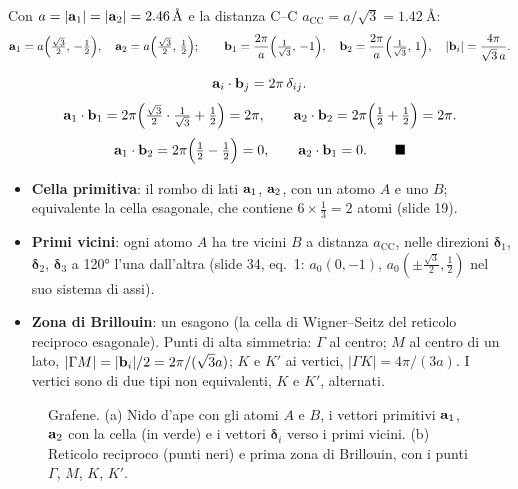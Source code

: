 \documentclass[11pt,a4paper]{article}
\begin{document}
\begin{risultato}
Con $a=|\mathbf a_1|=|\mathbf a_2|=\SI{2.46}{\angstrom}$ e la distanza C--C $a_{\mathrm{CC}}=a/\sqrt3=\SI{1.42}{\angstrom}$:
\[
\mathbf a_1=a\Bigl(\tfrac{\sqrt3}2,\,-\tfrac12\Bigr),\quad \mathbf a_2=a\Bigl(\tfrac{\sqrt3}2,\,\tfrac12\Bigr);\qquad
\mathbf b_1=\frac{2\pi}a\Bigl(\tfrac1{\sqrt3},\,-1\Bigr),\quad \mathbf b_2=\frac{2\pi}a\Bigl(\tfrac1{\sqrt3},\,1\Bigr),\quad |\mathbf b_i|=\frac{4\pi}{\sqrt3\,a}.
\]
\end{risultato}
\begin{dimostrazione}
\[ \mathbf a_i\cdot\mathbf b_j=2\pi\,\delta_{ij}. \]
\[ \mathbf a_1\cdot\mathbf b_1=2\pi\Bigl(\tfrac{\sqrt3}2\cdot\tfrac1{\sqrt3}+\tfrac12\Bigr)=2\pi,\qquad \mathbf a_2\cdot\mathbf b_2=2\pi\Bigl(\tfrac12+\tfrac12\Bigr)=2\pi. \]
\[ \va_1\cdot\vb_2=2\pi\Bigl(\tfrac12-\tfrac12\Bigr)=0,\qquad \va_2\cdot\vb_1=0.\qed \]
\end{dimostrazione}

\begin{itemize}
\item \textbf{Cella primitiva}: il rombo di lati $\mathbf a_1$, $\mathbf a_2$, con un atomo $A$ e uno $B$; equivalente la cella esagonale, che contiene
$6\times\frac13=2$ atomi (slide 19).
\item \textbf{Primi vicini}: ogni atomo $A$ ha tre vicini $B$ a distanza $a_{\mathrm{CC}}$, nelle direzioni $\bm\delta_1$, $\bm\delta_2$, $\bm\delta_3$ a
\ang{120} l'una dall'altra (slide 34, eq.~1: $a_0(0,-1)$, $a_0(\pm\frac{\sqrt3}2,\frac12)$ nel suo sistema di assi).
\item \textbf{Zona di Brillouin}: un esagono (la cella di Wigner--Seitz del reticolo reciproco esagonale). Punti di alta simmetria: $\Gamma$ al centro;
$M$ al centro di un lato, $|\Gamma M|=|\mathbf b_i|/2=2\pi/(\sqrt3a)$; $K$ e $K'$ ai vertici, $|\Gamma K|=4\pi/(3a)$. I vertici sono di due tipi non
equivalenti, $K$ e $K'$, alternati.
\end{itemize}

\begin{figure}[tbp]
\centering{}
\caption{Grafene. (a) Nido d'ape con gli atomi $A$ e $B$, i vettori primitivi $\mathbf a_1$, $\mathbf a_2$ con la cella (in verde) e i vettori $\bm\delta_i$ verso
i primi vicini. (b) Reticolo reciproco (punti neri) e prima zona di Brillouin, con i punti $\Gamma$, $M$, $K$, $K'$.}\label{fig:grafenereticolo}
\end{figure}
\end{document}
